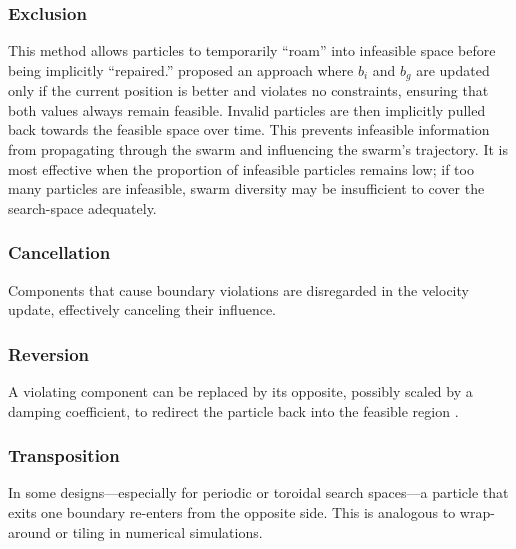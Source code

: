 {\subsubsection{Exclusion}
    This method allows particles to temporarily ``roam'' into infeasible space before being implicitly  ``repaired.''  \citet{hu2002solving} proposed an approach where $b_i$ and $b_g$ are updated only if the current position is better and violates no constraints, ensuring that both values always remain feasible.
    Invalid particles are then implicitly pulled back towards the feasible space over time. This prevents infeasible information from propagating through the swarm and influencing the swarm’s trajectory.  
    It 
    is most effective when the proportion of infeasible particles remains low; if too many particles are infeasible, swarm diversity may be insufficient to cover the \gls{search-space} adequately.
\subsubsection{Cancellation}
    Components that cause boundary violations are disregarded in the velocity update, effectively canceling their influence.
\subsubsection{Reversion}
    A violating component can be replaced by its opposite, possibly scaled by a damping coefficient, to redirect the particle back into the feasible region \citep[cf.][]{clerc2006particle}.
\subsubsection{Transposition}
    In some designs---especially for periodic or toroidal search spaces---a particle that exits one boundary re-enters from the opposite side. This is analogous to wrap-around or tiling in numerical simulations.
}
